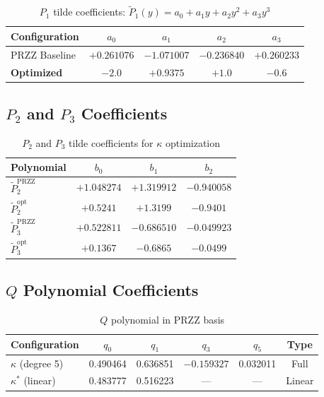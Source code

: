 \documentclass[11pt]{article}
\begin{document}
\begin{table}[h]
\centering
\caption{$P_1$ tilde coefficients: $\tilde{P}_1(y) = a_0 + a_1 y + a_2 y^2 + a_3 y^3$}
\begin{tabular}{lcccc}
\toprule
Configuration & $a_0$ & $a_1$ & $a_2$ & $a_3$ \\
\midrule
PRZZ Baseline & $+0.261076$ & $-1.071007$ & $-0.236840$ & $+0.260233$ \\
\textbf{Optimized} & $\mathbf{-2.0}$ & $\mathbf{+0.9375}$ & $\mathbf{+1.0}$ & $\mathbf{-0.6}$ \\
\bottomrule
\end{tabular}
\end{table}

\subsection{$P_2$ and $P_3$ Coefficients}

\begin{table}[h]
\centering
\caption{$P_2$ and $P_3$ tilde coefficients for $\kappa$ optimization}
\begin{tabular}{lccc}
\toprule
Polynomial & $b_0$ & $b_1$ & $b_2$ \\
\midrule
$\tilde{P}_2^{\text{PRZZ}}$ & $+1.048274$ & $+1.319912$ & $-0.940058$ \\
$\tilde{P}_2^{\text{opt}}$ & $+0.5241$ & $+1.3199$ & $-0.9401$ \\
\midrule
$\tilde{P}_3^{\text{PRZZ}}$ & $+0.522811$ & $-0.686510$ & $-0.049923$ \\
$\tilde{P}_3^{\text{opt}}$ & $+0.1367$ & $-0.6865$ & $-0.0499$ \\
\bottomrule
\end{tabular}
\end{table}

\subsection{$Q$ Polynomial Coefficients}

\begin{table}[h]
\centering
\caption{$Q$ polynomial in PRZZ basis}
\begin{tabular}{lccccc}
\toprule
Configuration & $q_0$ & $q_1$ & $q_3$ & $q_5$ & Type \\
\midrule
$\kappa$ (degree 5) & 0.490464 & 0.636851 & $-0.159327$ & 0.032011 & Full \\
$\kappa^*$ (linear) & 0.483777 & 0.516223 & --- & --- & Linear \\
\bottomrule
\end{tabular}
\end{table}
\end{document}

